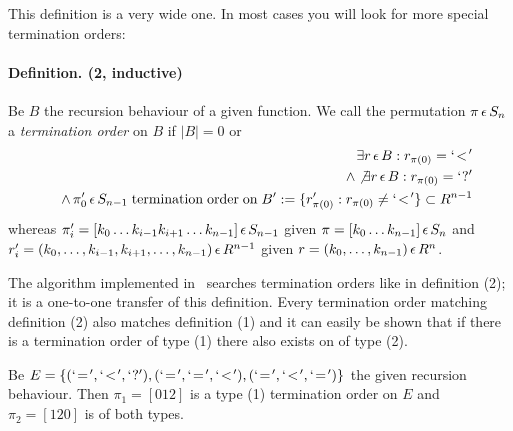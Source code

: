 This definition is a very wide one. In most cases you will look for
more special termination orders:

\paragraph*{Definition. (2, inductive)}
Be $B$ the recursion behaviour of a given function.
We call the permutation $\pi \,\epsilon\, S_n$ a {\em termination order} on $B$
if $|B| = 0$ or
\begin{eqnarray}
    && \exists r \,\epsilon\, B : r_{\pi(0)} = `\!<\!' \nonumber\\
    && \land \not\exists r \,\epsilon\, B : r_{\pi(0)} = `?'
    \nonumber\\
    &&  \land \,\pi'_{0} \,\epsilon\, S_{n-1} \;\mathrm{termination}\;\mathrm{order}
    \;\mathrm{on}\; B' := \{r'_{\pi(0)} : r_{\pi(0)} \not= `\!<\!'\} \subset
    R^{n-1} \nonumber
\end{eqnarray}
whereas $\pi'_i = [k_0 \dots k_{i-1} k_{i+1} \dots k_{n-1}] \,\epsilon\, S_{n-1}$ given
$\pi = [k_0 \dots k_{n-1}] \,\epsilon\, S_n$ and $r'_i = (k_0, \dots, k_{i-1},
k_{i+1}, \dots, k_{n-1}) \,\epsilon\, R^{n-1}$ given $r = (k_0, \dots, k_{n-1})
\,\epsilon\, R^n$.


The algorithm implemented in \foetus\ searches termination orders
like in definition (2); it is a one-to-one transfer of this
definition. Every termination order matching definition (2) also
matches definition (1) and it can easily be shown that if there is a
termination order of type (1) there also exists on of type (2).
\begin{example}
Be $E = \{(\equal, \less, \unknown), (\equal, \equal, \less), (\equal,
\less, \equal)\}$ the given recursion behaviour. Then $\pi_1 = [0 1
2]$ is a type (1) termination order on $E$ and $\pi_2 = [1 2 0]$ is of
both types.
\end{example}


